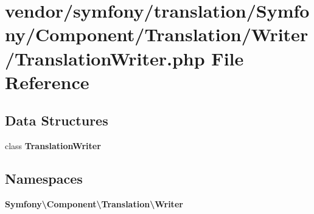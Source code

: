 \section{vendor/symfony/translation/\+Symfony/\+Component/\+Translation/\+Writer/\+Translation\+Writer.php File Reference}
\label{_translation_writer_8php}
\subsection*{Data Structures}
\begin{DoxyCompactItemize}
\item 
class {\bf Translation\+Writer}
\end{DoxyCompactItemize}
\subsection*{Namespaces}
\begin{DoxyCompactItemize}
\item 
 {\bf Symfony\textbackslash{}\+Component\textbackslash{}\+Translation\textbackslash{}\+Writer}
\end{DoxyCompactItemize}
